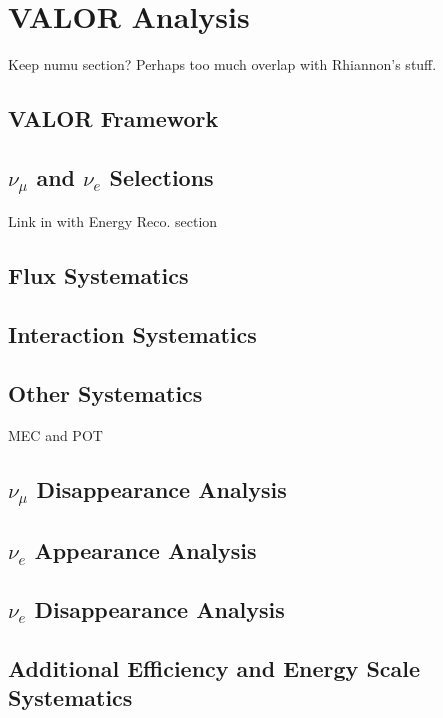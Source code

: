 \chapter{VALOR Analysis}
\label{chap:VALOR}

Keep numu section? Perhaps too much overlap with Rhiannon's stuff.

\section{VALOR Framework}
\section{\texorpdfstring{$\nu_\mu$ and $\nu_e$ Selections}{numu and nue Selections}}
Link in with Energy Reco. section
\section{Flux Systematics}
\section{Interaction Systematics}
\section{Other Systematics}
MEC and POT
\section{\texorpdfstring{$\nu_\mu$ Disappearance Analysis}{numu Disappearance Analysis}}
\section{\texorpdfstring{$\nu_e$ Appearance Analysis}{nue Appearance Analysis}}
\section{\texorpdfstring{$\nu_e$ Disappearance Analysis}{nue Disappearance Analysis}}
\section{Additional Efficiency and Energy Scale Systematics}


